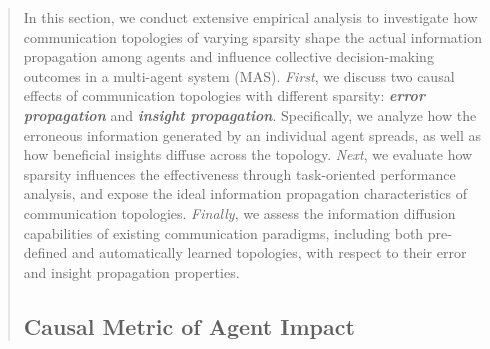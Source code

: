 \documentclass[11pt]{article}
\begin{document}
\begin{abstract}

In this section, we conduct extensive empirical analysis to investigate how communication topologies of varying sparsity shape the actual information propagation among agents and influence collective decision-making outcomes in a multi-agent system (MAS). \textit{First}, we discuss two causal effects of communication topologies with different sparsity: \textbf{\textit{error propagation}} and \textbf{\textit{insight propagation}}. Specifically, we analyze how the erroneous information generated by an individual agent spreads, as well as how beneficial insights diffuse across the topology. \textit{Next}, we evaluate how sparsity influences the effectiveness through task-oriented performance analysis, and expose the ideal information propagation characteristics of communication topologies. \textit{Finally}, we assess the information diffusion capabilities of existing communication paradigms, including both pre-defined and automatically learned topologies, with respect to their error and insight propagation properties.

\subsection{Causal Metric of Agent Impact}


\end{abstract}
\end{document}
